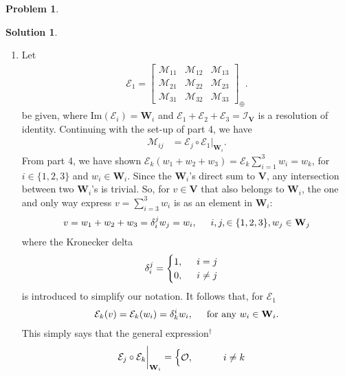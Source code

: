 \documentclass{article}
\theoremstyle{definition}
\newtheorem*{prob*}{Problem}
\newtheorem*{sln*}{Solution}
\newcommand{\V}{\mathbf{V}}
\newcommand{\W}{\mathbf{W}}
\newcommand{\M}{\mathcal{M}}
\newcommand{\E}{\mathcal{E}}
\newcommand{\ima}{\text{Im}}
\begin{document}
\begin{prob*}
\begin{sln*}
\begin{enumerate}
			\newpage
			
			
			
			
			
			
			
			\item Let
			\begin{align*}
			\mathcal{E}_1 = \begin{bmatrix}
			\M_{11} & \M_{12} & \M_{13}\\
			\M_{21} & \M_{22} & \M_{23}\\
			\M_{31} & \M_{32} & \M_{33}
			\end{bmatrix}_\oplus.
			\end{align*}
			be given, where $\ima(\E_i) = \W_i$ and $\E_1 + \E_2 + \E_3 = \mathcal{I}_\V$ is a resolution of identity. Continuing with the set-up of part 4, we have
			\begin{align*}
			\M_{ij} &= \E_j \circ \E_1\bigg\vert_{\W_i}.
			\end{align*}
			From part 4, we have shown $\E_k(w_1 + w_2 + w_3) = \E_k\sum_{i=1}^3w_i = w_k$, for $i\in \{1,2,3 \}$ and $w_i \in \W_i$. Since the $\W_i$'s direct sum to $\V$, any intersection between two $\W_i$'s is trivial. So, for $v\in \V$ that also belongs to $\W_i$, the one and only way express $v = \sum^3_{i=3}w_i$ is as an element in $\W_i$:
			\begin{align*}
			v = w_1 + w_2 + w_3 =  \delta^j_iw_j = w_i, \hspace{0.5cm} i,j,\in \{1,2,3\}, w_j\in \W_j
			\end{align*}
			where the Kronecker delta
			\begin{align*}
			\delta^j_i = \begin{cases}
			1,\hspace{0.5cm}i=j\\
			0,\hspace{0.5cm}i\neq j
			\end{cases}
			\end{align*}
			is introduced to simplify our notation. It follows that, for $\E_1$
			\begin{align*}
			\E_k(v) = \E_k(w_i) = \delta^i_kw_i, \hspace{0.5cm}\text{for any } w_i\in\W_i.
			\end{align*}
			This simply says that the general expression$^\dagger$
			\begin{align*}
			\E_j\circ\E_k\bigg\vert_{\W_i} =
			\begin{cases}
			\mathcal{O},\hspace{1.1 cm} i\neq k\\

\end{cases}
\end{align*}
\end{enumerate}
\end{sln*}
\end{prob*}
\end{document}
